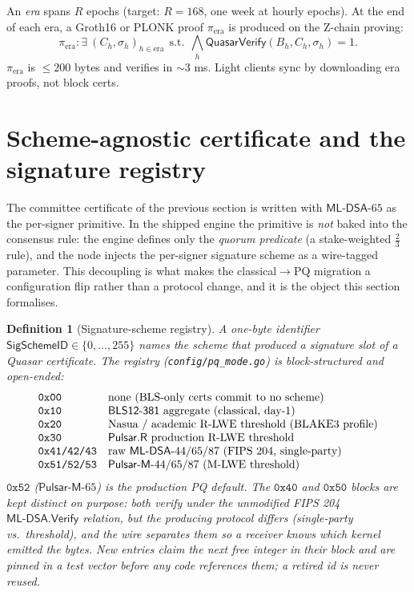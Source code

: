 \documentclass[11pt]{article}
\newtheorem{definition}[theorem]{Definition}
\begin{document}
An \emph{era} spans $R$ epochs (target: $R = 168$, one week at hourly epochs).
At the end of each era, a Groth16 or PLONK proof $\pi_{\text{era}}$ is
produced on the Z-chain proving:
\[
  \pi_{\text{era}} : \exists\ (C_h, \sigma_h)_{h \in \text{era}}\ \ \text{s.t.}\ \ \bigwedge_h \mathsf{QuasarVerify}(B_h, C_h, \sigma_h) = 1.
\]
$\pi_{\text{era}}$ is $\leq 200$ bytes and verifies in $\sim 3$ ms.
Light clients sync by downloading era proofs, not block certs.

\section{Scheme-agnostic certificate and the signature registry}
\label{sec:scheme-agnostic}

The committee certificate of the previous section
is written with $\mathsf{ML\text{-}DSA}\text{-}65$ as the per-signer
primitive. In the shipped engine the primitive is \emph{not} baked into
the consensus rule: the engine defines only the \emph{quorum predicate}
(a stake-weighted $\tfrac23$ rule), and the node injects the per-signer
signature scheme as a wire-tagged parameter. This decoupling is what
makes the classical$\to$PQ migration a configuration flip rather than a
protocol change, and it is the object this section formalises.

\begin{definition}[Signature-scheme registry]
\label{def:sigscheme-registry}
A one-byte identifier $\mathsf{SigSchemeID} \in \{0,\dots,255\}$ names
the scheme that produced a signature slot of a Quasar certificate. The
registry (\texttt{config/pq\_mode.go}) is block-structured and
open-ended:
\[
\begin{array}{ll}
\texttt{0x00} & \text{none (BLS-only certs commit to no scheme)}\\
\texttt{0x10} & \mathsf{BLS12\text{-}381}\ \text{aggregate (classical, day-1)}\\
\texttt{0x20} & \text{Nasua / academic R\text{-}LWE threshold (BLAKE3 profile)}\\
\texttt{0x30} & \mathsf{Pulsar.R}\ \text{production R\text{-}LWE threshold}\\
\texttt{0x41/42/43} & \text{raw } \mathsf{ML\text{-}DSA}\text{-}44/65/87\ \text{(FIPS 204, single-party)}\\
\texttt{0x51/52/53} & \mathsf{Pulsar\text{-}M}\text{-}44/65/87\ \text{(M\text{-}LWE threshold)}\\
\end{array}
\]
$\texttt{0x52}$ ($\mathsf{Pulsar\text{-}M}\text{-}65$) is the production PQ
default. The $\texttt{0x40}$ and $\texttt{0x50}$ blocks are kept distinct
on purpose: both verify under the \emph{unmodified} FIPS 204
$\mathsf{ML\text{-}DSA.Verify}$ relation, but the producing protocol
differs (single-party vs.\ threshold), and the wire separates them so a
receiver knows which kernel emitted the bytes. New entries claim the
next free integer in their block and are pinned in a test vector before
any code references them; a retired id is never reused.
\end{definition}
\end{document}
